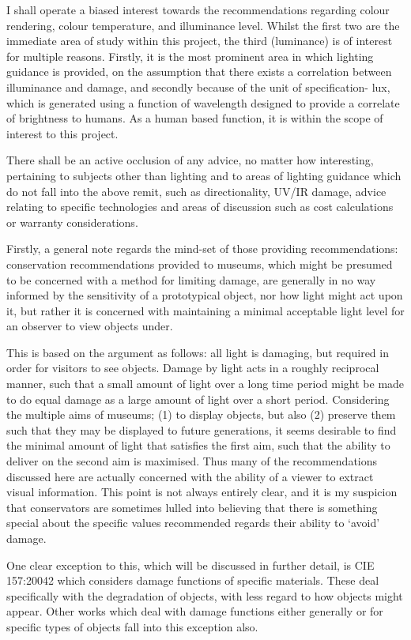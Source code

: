 I shall operate a biased interest towards the recommendations regarding colour rendering, colour temperature, and illuminance level. Whilst the first two are the immediate area of study within this project, the third (luminance) is of interest for multiple reasons. Firstly, it is the most prominent area in which lighting guidance is provided, on the assumption that there exists a correlation between illuminance and damage, and secondly because of the unit of specification- lux, which is generated using a function of wavelength designed to provide a correlate of brightness to humans. As a human based function, it is within the scope of interest to this project.

There shall be an active occlusion of any advice, no matter how interesting, pertaining to subjects other than lighting and to areas of lighting guidance which do not fall into the above remit, such as directionality, UV/IR damage, advice relating to specific technologies and areas of discussion such as cost calculations or warranty considerations. 

Firstly, a general note regards the mind-set of those providing recommendations: conservation recommendations provided to museums, which might be presumed to be concerned with a method for limiting damage, are generally in no way informed by the sensitivity of a prototypical object, nor how light might act upon it, but rather it is concerned with maintaining a minimal acceptable light level for an observer to view objects under.

This is based on the argument as follows: all light is damaging, but required in order for visitors to see objects. Damage by light acts in a roughly reciprocal manner, such that a small amount of light over a long time period might be made to do equal damage as a large amount of light over a short period. Considering the multiple aims of museums; (1) to display objects, but also (2) preserve them such that they may be displayed to future generations, it seems desirable to find the minimal amount of light that satisfies the first aim, such that the ability to deliver on the second aim is maximised. Thus many of the recommendations discussed here are actually concerned with the ability of a viewer to extract visual information. This point is not always entirely clear, and it is my suspicion that conservators are sometimes lulled into believing that there is something special about the specific values recommended regards their ability to ‘avoid’ damage. 

One clear exception to this, which will be discussed in further detail, is CIE 157:20042 which considers damage functions of specific materials. These deal specifically with the degradation of objects, with less regard to how objects might appear. Other works which deal with damage functions either generally or for specific types of objects fall into this exception also.

